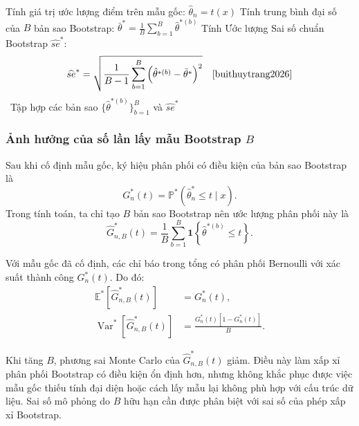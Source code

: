	\begin{algorithm}[H]
		\BlankLine
		Tính giá trị ước lượng điểm trên mẫu gốc: $\hat{\theta}_n = t(x)$ \cite{buithuytrang2026}\;
		Tính trung bình đại số của $B$ bản sao Bootstrap: $\bar{\theta}^* = \frac{1}{B}\sum_{b=1}^{B} \hat{\theta}^{*(b)}$ \cite{buithuytrang2026}\;
		Tính Ước lượng Sai số chuẩn Bootstrap $\widehat{se}^*$:
		\begin{equation}
			\widehat{se}^* = \sqrt{\frac{1}{B-1}\sum_{b=1}^{B} \left(\hat{\theta}^{*(b)} - \bar{\theta}^*\right)^2} \quad \cite{buithuytrang2026}
		\end{equation}\
		\Return Tập hợp các bản sao $\{\hat{\theta}^{*(b)}\}_{b=1}^B$ và $\widehat{se}^*$ \cite{buithuytrang2026}\;
		\caption{Thuật toán lấy mẫu lại Monte Carlo cho Bootstrap}
	\end{algorithm}
	\subsubsection{Ảnh hưởng của số lần lấy mẫu Bootstrap $B$}
	
	Sau khi cố định mẫu gốc, ký hiệu phân phối có điều kiện của bản sao
	Bootstrap là
	\[
	G_n^*(t)
	=
	\mathbb{P}^*\left(\hat{\theta}_n^* \leq t \mid x\right).
	\]
	Trong tính toán, ta chỉ tạo $B$ bản sao Bootstrap nên ước lượng phân phối
	này là
	\[
	\widehat{G}_{n,B}^*(t)
	=
	\frac{1}{B}\sum_{b=1}^{B}
	\mathbf{1}\left\{\hat{\theta}^{*(b)}\leq t\right\}.
	\]
	
	Với mẫu gốc đã cố định, các chỉ báo trong tổng có phân phối Bernoulli
	với xác suất thành công $G_n^*(t)$. Do đó:
	\begin{align}
		\mathbb{E}^*\left[\widehat{G}_{n,B}^*(t)\right]
		&=G_n^*(t),\\
		\operatorname{Var}^*\left[\widehat{G}_{n,B}^*(t)\right]
		&=\frac{G_n^*(t)\left[1-G_n^*(t)\right]}{B}.
	\end{align}
	
	Khi tăng $B$, phương sai Monte Carlo của $\widehat{G}_{n,B}^*(t)$ giảm.
	Điều này làm xấp xỉ phân phối Bootstrap có điều kiện ổn định hơn, nhưng
	không khắc phục được việc mẫu gốc thiếu tính đại diện hoặc cách lấy mẫu
	lại không phù hợp với cấu trúc dữ liệu. Sai số mô phỏng do $B$ hữu hạn
	cần được phân biệt với sai số của phép xấp xỉ Bootstrap.
	
